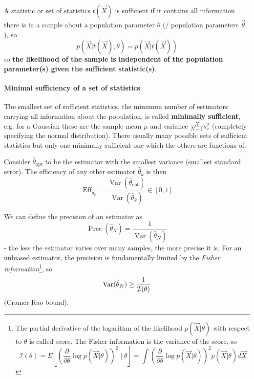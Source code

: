 A statistic or set of statistics $t(\vec{X})$ is sufficient if it contains all information there is in a sample
about a population parameter $\theta$ (/ population parameters $\vec{\theta}$), so
\begin{equation}
   p(\vec{X} | t(\vec{X}), \theta) = p(\vec{X} | t(\vec{X}))
\end{equation}
so \textbf{the likelihood of the sample is independent of the population parameter(s) given the sufficient statistic(s)}.

\paragraph*{Minimal sufficiency of a set of statistics} The smallest set of sufficient statistics, the minimum number of estimators
carrying all information about the population, is called \textbf{minimally sufficient}, e.g. for a Gaussian these
are the sample mean $\mu$ and variance $\frac{N}{N-1} s_x^2$ (completely specifying the normal distribution). There
usually many possible sets of sufficient statistics but only one minimally sufficient one which the others
are functions of.

Consider $\hat{\theta}_\text{opt}$ to be the estimator with the smallest variance (smallest standard error).
The efficiency of any other estimator $\hat{\theta}_k$ is then
\begin{equation}
    \operatorname{Eff}_{\hat{\theta}_k} = \frac{\operatorname{Var}(\hat{\theta}_\text{opt})}{\operatorname{Var}(\hat{\theta}_k)} \in [0,1]
\end{equation}

We can define the precision of an estimator as
\begin{equation}
    \operatorname{Prec}(\hat{\theta}_N) = \frac{1}{\operatorname{Var}(\hat{\theta}_N)}
\end{equation}
- the less the estimator varies over many samples, the more precise it is. For an
unbiased estimator, the precision is fundamentally limited by the \textit{Fisher information}\footnote{
    The partial derivative of the logarithm of the likelihood $p(\vec{X} | \theta)$ with respect to $\theta$ is called score.
    The Fisher information is the variance of the score, so
    \begin{equation}
        \mathcal{I}(\theta) = E\left[ \left( \frac{\partial}{\partial \theta} \log p(\vec{X} | \theta) \right)^2 \mid \theta \right] = \int \left( \frac{\partial}{\partial \theta} \log p(\vec{X} | \theta) \right)^2 p(\vec{X} | \theta) d\vec{X}
    \end{equation}
}, so
\begin{equation}
    \operatorname{Var}(\hat{\theta}_N) \geq \frac{1}{\mathcal{I}(\theta)}
\end{equation}
(Cramer-Rao bound).

